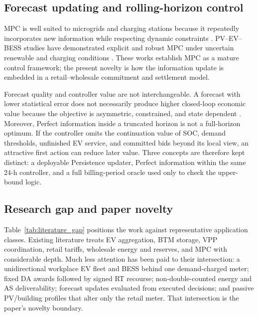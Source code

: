 \documentclass[final,5p,times]{elsarticle}
\begin{document}
\subsection{Forecast updating and rolling-horizon control}
MPC is well suited to microgrids and charging stations because it repeatedly incorporates new information while respecting dynamic constraints \cite{parisio2014model,rawlings2017mpc,hermans2024implementation,klemets2024charging}. PV--EV--BESS studies have demonstrated explicit and robust MPC under uncertain renewable and charging conditions \cite{cabrera2022realtime,cabrera2024robust}. These works establish MPC as a mature control framework; the present novelty is how the information update is embedded in a retail--wholesale commitment and settlement model.

Forecast quality and controller value are not interchangeable. A forecast with lower statistical error does not necessarily produce higher closed-loop economic value because the objective is asymmetric, constrained, and state dependent \cite{ludolfinger2025prediction}. Moreover, Perfect information inside a truncated horizon is not a full-horizon optimum. If the controller omits the continuation value of SOC, demand thresholds, unfinished EV service, and committed bids beyond its local view, an attractive first action can reduce later value. Three concepts are therefore kept distinct: a deployable Persistence updater, Perfect information within the same 24-h controller, and a full billing-period oracle used only to check the upper-bound logic.

\subsection{Research gap and paper novelty}
Table~\ref{tab:literature_gap} positions the work against representative application classes. Existing literature treats EV aggregation, BTM storage, VPP coordination, retail tariffs, wholesale energy and reserves, and MPC with considerable depth. Much less attention has been paid to their intersection: a unidirectional workplace EV fleet and BESS behind one demand-charged meter; fixed DA awards followed by signed RT recourse; non-double-counted energy and AS deliverability; forecast updates evaluated from executed decisions; and passive PV/building profiles that alter only the retail meter. That intersection is the paper's novelty boundary.
\end{document}
